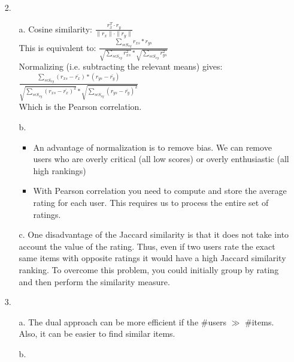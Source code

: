 \documentclass{article}
\begin{document}
\begin{itemize}
\pagebreak
\item[2.]
	\begin{itemize}
		\item[a.] Cosine similarity: $\frac{r_{x}^{T}\cdot r_{y}}{\parallel r_{x} \parallel \cdot \parallel r_{y} \parallel}$\\
		 This is equivalent to: 
		 	$\frac{\sum_{s \epsilon S_{xy}} r_{xs}*r_{ys}}{\sqrt{\sum_{s \epsilon S_{xy}} r_{xs}^{2}} * \sqrt{\sum_{s \epsilon S_{xy}} r_{ys}^{2}}}$\\
		 Normalizing (i.e. subtracting the relevant means) gives:
		 	$\frac{\sum_{s \epsilon S_{xy}} (r_{xs} - \bar{r_{x}})*(r_{ys}-\bar{r_{y}})}{\sqrt{\sum_{s \epsilon S_{xy}} (r_{xs} - \bar{r_{x}})^{2}} * \sqrt{\sum_{s \epsilon S_{xy}} (r_{ys}-\bar{r_{y}})^{2}}}$\\
		 	Which is the Pearson correlation.
		\item[b.] 
			\begin{itemize}
				\item An advantage of normalization is to remove bias. We can remove users who are overly critical (all low scores) or overly enthusiastic (all high rankings)
				\item With Pearson correlation you need to compute and store the average rating for each user. This requires us to process the entire set of ratings.
			\end{itemize}
		\item[c.] One disadvantage of the Jaccard similarity is that it does not take into account the value of the rating. Thus, even if two users rate the exact same items with opposite ratings it would have a high Jaccard similarity ranking. To overcome this problem, you could initially group by rating and then perform the similarity measure. 
	\end{itemize}

\pagebreak
\item[3.]
	\begin{itemize}
		\item[a.] The dual approach can be more efficient if the \#users $\gg$ \#items. Also, it can be easier to find similar items.
		\item[b.]
	\end{itemize}
	
\end{itemize}
\end{document}
